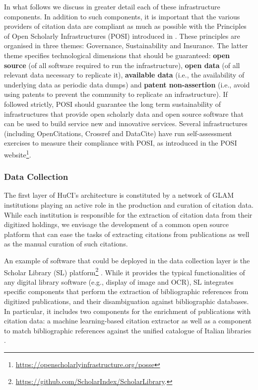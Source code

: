 In what follows we discuss in greater detail each of these infrastructure components. In addition to such components, it is important that the various providers of citation data are compliant as much as possible with the Principles of Open Scholarly Infrastructures (POSI) introduced in \cite{bilder_principles_2015}. These principles are organised in three themes: Governance, Sustainability and Insurance. The latter theme specifies technological dimensions that should be guaranteed: \textbf{open source} (of all software required to run the infrastructure), \textbf{open data} (of all relevant data necessary to replicate it), \textbf{available data} (i.e., the availability of underlying data as periodic data dumps) and \textbf{patent non-assertion} (i.e., avoid using patents to prevent the community to replicate an infrastructure). If followed strictly, POSI should guarantee the long term sustainability of infrastructures that provide open scholarly data and open source software that can be used to build service new and innovative services. Several infrastructures (including OpenCitations, Crossref and DataCite) have run self-assessment exercises to measure their compliance with POSI, as introduced in the POSI website\footnote{\url{https://openscholarlyinfrastructure.org/posse}}.

\subsubsection{Data Collection}

The first layer of HuCI's architecture is constituted by a network of GLAM institutions playing an active role in the production and curation of citation data. While each institution is responsible for the extraction of citation data from their digitized holdings, we envisage the development of a common open source platform that can ease the tasks of extracting citations from publications as well as the manual curation of such citations. 

An example of software that could be deployed in the data collection layer is the Scholar Library (SL) platform\footnote{\url{https://github.com/ScholarIndex/ScholarLibrary}.} \cite{colavizza_linked_2018}. While it provides the typical functionalities of any digital library software (e.g., display of image and OCR), SL integrates specific components that perform the extraction of bibliographic references from digitized publications, and their disambiguation against bibliographic databases. In particular, it includes two components for the enrichment of publications with citation data: a machine learning-based citation extractor as well as a component to match bibliographic references against the unified catalogue of Italian libraries \cite{colavizza_references_2018}. 

